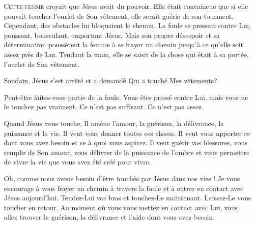 \dvrule







\lettrine{C}{ette femme} croyait que Jésus avait du pouvoir.
 Elle était convaincue que si elle pouvait toucher l'ourlet de Son vêtement,
 elle serait guérie de son tourment. Cependant, des obstacles
 lui bloquaient le chemin. La foule se pressait contre Lui,
 poussant, bousculant, emportant Jésus.
 Mais son propre désespoir et sa détermination poussèrent la femme
 à se frayer un chemin jusqu'à ce qu'elle soit assez près de Lui.
 Tendant la main, elle se saisit de la chose qui était à sa portée,
 l'ourlet de Son vêtement.

Soudain, Jésus s'est arrêté et a demandé\frcolon{} 
 \Og Qui a touché Mes vêtements? \Fg{}


Peut-être faites-vous partie de la foule. Vous êtes pressé contre Lui,
 mais vous ne le touchez pas vraiment. Ce n'est pas suffisant.
 Ce n'est pas assez.

Quand Jésus vous touche, Il amène l'amour, la guérison, la délivrance,
 la puissance et la vie. Il veut vous donner toutes ces choses.
 Il veut vous  apporter ce dont vous avez besoin
 et ce à quoi vous aspirez. Il veut guérir vos blessures,
 vous remplir de Son amour, vous délivrer de la puissance de l'ombre
 et vous permettre de vivre la vie que vous avez été créé pour vivre.

Oh, comme nous avons besoin d'être touchés par Jésus dans nos vies !
 Je vous encourage à vous frayer un chemin à travers la foule
 et à entrer en contact avec Jésus aujourd'hui.
 Tendez-Lui  vos bras et touchez-Le 
 maintenant. Laissez-Le   vous toucher en retour.
 Au moment où vous vous mettez en contact avec Lui,
 vous allez trouver la guérison, la délivrance et l'aide dont vous avez besoin.

